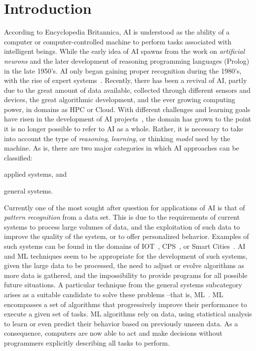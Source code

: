 
\section{Introduction}
\label{sec:introduction}

According to Encyclopedia Britannica, \ac{AI} is understood as the ability of a computer or 
computer-controlled machine to perform tasks associated with intelligent beings. While the early 
idea of \ac{AI} spawns from the work on \textit{artificial neurons} and the later development of
reasoning programming languages (\eg Prolog) in the late 1950's. \ac{AI} only began gaining proper 
recognition during the 1980's, with the rise of expert systems~\cite{russel09}.  Recently, there has 
been a revival of \ac{AI}, partly due to the great amount of data available, collected through different 
sensors and devices, the 
great algorithmic development, and the ever growing computing power, in domains as \ac{HPC} or 
Cloud. With different challenges and learning goals have risen in the development of \ac{AI} 
projects~\cite{russel09}, the domain has grown to the point it is no longer possible to refer to \ac{AI} 
as a whole. Rather, it is necessary to take into account the type of \emph{reasoning}, 
\emph{learning}, or thinking \emph{model} used by the machine. As is, there are two major categories 
in which \ac{AI} approaches can be classified:
\begin{enumerate*}[label=(\arabic*)]
\item applied systems, and
\item general systems.
\end{enumerate*}

Currently one of the most sought after question for applications of \ac{AI} is that of \emph{pattern 
recognition} from a data set. This is due to the requirements of current systems to process large 
volumes of data, and the exploitation of such data to improve the quality of the system, or to offer 
personalized behavior. Examples of such systems can be found in the domains of 
\ac{IOT}~\cite{mattern10}, \ac{CPS}~\cite{holzl15}, or Smart Cities~\cite{zanella14}. \ac{AI} and 
\ac{ML} techniques seem to be appropriate for the development of such systems, given the large 
data to be processed, the need to adjust or evolve algorithms as more data is gathered, and the 
impossibility to provide programs for all possible future situations. 
A particular technique from the general systems subcategory arises 
as a suitable candidate to solve these problems --that is, \ac{ML}~\cite{mitchell97}. 
\ac{ML} encompasses a set of algorithms that progressively improve their performance to execute 
a given set of tasks. \ac{ML} algorithms rely on data, using statistical analysis to learn or even predict 
their behavior based on previously unseen data. As a consequence, computers are now able to act 
and make decisions without programmers explicitly describing all tasks to perform.

